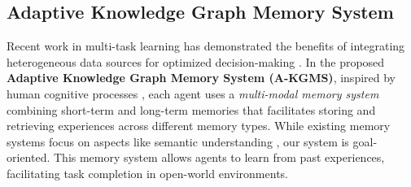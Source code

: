\subsection{Adaptive Knowledge Graph Memory System}\label{sec:memory}
Recent work in multi-task learning has demonstrated the benefits of integrating heterogeneous data sources for optimized decision-making \cite{baltruvsaitis2018multimodal, ngiam2011multimodal, xu2024predicting}. In the proposed \textbf{Adaptive Knowledge Graph Memory System (A-KGMS)}, inspired by human cognitive processes \cite{sumers2023cognitive}, each agent uses a \textit{multi-modal memory system} combining short-term and long-term memories that facilitates storing and retrieving experiences across different memory types. While existing memory systems focus on aspects like semantic understanding \cite{li2024optimus}, our system is goal-oriented.
This memory system allows agents to learn from past experiences, facilitating task completion in open-world environments. %


